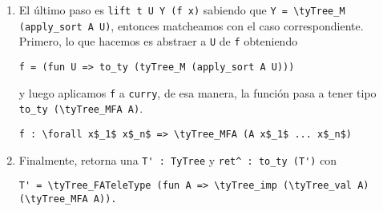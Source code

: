 \begin{enumerate}
    \item El último paso es \lstinline{lift t U Y (f x)} sabiendo que \lstinline{Y = \tyTree_M (apply_sort A U)}, entonces matcheamos con el caso correspondiente. Primero, lo que hacemos es abstraer a \lstinline{U} de \lstinline{f} obteniendo
    \begin{lstlisting}
f = (fun U => to_ty (tyTree_M (apply_sort A U)))
    \end{lstlisting}
    y luego aplicamos \lstinline{f} a \lstinline{curry}, de esa manera, la función pasa a tener tipo \lstinline{to_ty (\tyTree_MFA A)}.
    \begin{lstlisting}
f : \forall x$_1$ x$_n$ => \tyTree_MFA (A x$_1$ ... x$_n$)
    \end{lstlisting}
    \item Finalmente, \lift{} retorna una \lstinline{T' : TyTree} y \lstinline{ret^ : to_ty (T')} con
    \begin{lstlisting}
T' = \tyTree_FATeleType (fun A => \tyTree_imp (\tyTree_val A) (\tyTree_MFA A)).
    \end{lstlisting}
\end{enumerate}